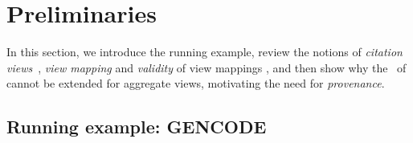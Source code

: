 \section{Preliminaries}\label{Sec: examples}
In this section, we introduce the running example, %
review the notions of \textit{citation views}~\cite{davidson2017model}, {\em view mapping} and {\em validity} of view mappings \cite{wu2018data}, and then show why the \rba\ of \cite{wu2018data} cannot be extended for aggregate views, motivating the need for {\em provenance}.

\subsection{Running example: GENCODE}\label{subsec:running example}



